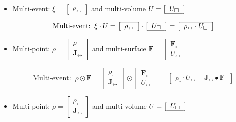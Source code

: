 \begin{itemize}
\item 
Multi-event: \(\xi = \left[\begin{array}{c} \hline \rho_\leftrightarrow \end{array}\right]\) and multi-volume \(U = \left[\begin{array}{c} U_\square \\ \hline \end{array} \right]\)

\[\text{Multi-event:} \;\; \xi \cdot U = \left[\begin{array}{c} \hline \rho_\leftrightarrow \end{array}\right] \cdot \left[\begin{array}{c} U_\square \\ \hline \end{array} \right] = \left[\begin{array}{c} \hline \rho_\leftrightarrow \cdot U_\square \end{array}\right]\]
\item 
Multi-point: \(\rho = \left[\begin{array}{c} \rho_\square \\ \hline \mathbf{J}_\leftrightarrow \end{array}\right]\) and multi-surface \(\mathbf{F} = \left[\begin{array}{c} \mathbf{F}_\square \\ \hline U_\leftrightarrow \end{array}\right]\)

\[\text{Multi-event:} \;\; \rho \odot \mathbf{F} = \left[\begin{array}{c} \rho_\square \\ \hline \mathbf{J}_\leftrightarrow \end{array}\right] \odot \left[\begin{array}{c} \mathbf{F}_\square \\ \hline U_\leftrightarrow \end{array}\right] = \left[\begin{array}{c} \hline \rho_\square \cdot U_\leftrightarrow + \mathbf{J}_\leftrightarrow \bullet \mathbf{F}_\square \end{array}\right]\]
\item 
Multi-point: \(\rho = \left[\begin{array}{c} \rho_\square \\ \hline \mathbf{J}_\leftrightarrow \end{array}\right]\) and multi-volume \(U = \left[\begin{array}{c} U_\square \\ \hline \end{array}\right]\)


\end{itemize}
